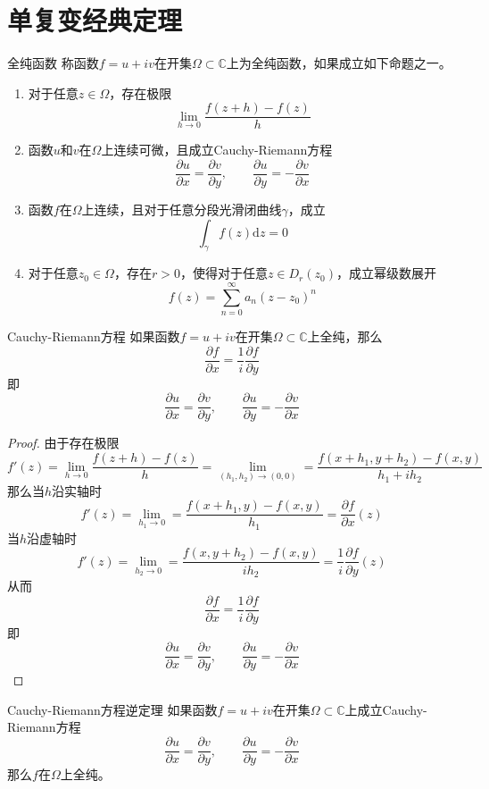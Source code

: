 \documentclass[lang = cn, scheme = chinese, thmcnt = section]{elegantbook}
\newcommand{\C}{\mathbb{C}}  		   %
\newcommand{\sub}{\subset}             %
\begin{document}
\chapter{单复变经典定理}

\begin{definition}{全纯函数}
	称函数$f=u+iv$在开集$\Omega\sub\C$上为全纯函数，如果成立如下命题之一。
	\begin{enumerate}
		\item 对于任意$z\in\Omega$，存在极限%
		$$
		\lim_{h\to 0}\frac{f(z+h)-f(z)}{h}
		$$
		\item 函数$u$和$v$在$\Omega$​上连续可微，且成立Cauchy-Riemann方程
		$$
		\frac{\partial u}{\partial x}=\frac{\partial v}{\partial y},
		\qquad
		\frac{\partial u}{\partial y}=-\frac{\partial v}{\partial x}
		$$
		\item 函数$f$在$\Omega$上连续，且对于任意分段光滑闭曲线$\gamma$，成立%
		$$
		\int_\gamma{f(z)\mathrm{d}z}=0
		$$
		\item 对于任意$z_0\in \Omega$，存在$r>0$，使得对于任意$z\in D_r(z_0)$，成立幂级数展开
		$$
		f(z)=\sum_{n=0}^{\infty}{a_n(z-z_0)^n}
		$$
	\end{enumerate}
\end{definition}

\begin{theorem}{Cauchy-Riemann方程}
	如果函数$f=u+iv$在开集$\Omega\sub\C$上全纯，那么
	$$
	\frac{\partial f}{\partial x}=\frac{1}{i}\frac{\partial f}{\partial y}
	$$
	即
	$$
	\frac{\partial u}{\partial x}=\frac{\partial v}{\partial y},
	\qquad
	\frac{\partial u}{\partial y}=-\frac{\partial v}{\partial x}
	$$
\end{theorem}

\begin{proof}
	由于存在极限%
	$$
	f'(z)=\lim_{h\to 0}\frac{f(z+h)-f(z)}{h}
	=\lim_{(h_1,h_2)\to (0,0)}=\frac{f(x+h_1,y+h_2)-f(x,y)}{h_1+ih_2}
	$$
	那么当$h$沿实轴时%
	$$
	f'(z)=\lim_{h_1\to 0}=\frac{f(x+h_1,y)-f(x,y)}{h_1}=\frac{\partial f}{\partial x}(z)
	$$
	当$h$沿虚轴时%
	$$
	f'(z)=\lim_{h_2\to 0}=\frac{f(x,y+h_2)-f(x,y)}{ih_2}=\frac{1}{i}\frac{\partial f}{\partial y}(z)
	$$
	从而
	$$
	\frac{\partial f}{\partial x}=\frac{1}{i}\frac{\partial f}{\partial y}
	$$
	即
	$$
	\frac{\partial u}{\partial x}=\frac{\partial v}{\partial y},
	\qquad
	\frac{\partial u}{\partial y}=-\frac{\partial v}{\partial x}
	$$
\end{proof}

\begin{theorem}{Cauchy-Riemann方程逆定理}
	如果函数$f=u+iv$在开集$\Omega\sub\C$上成立Cauchy-Riemann方程
	$$
	\frac{\partial u}{\partial x}=\frac{\partial v}{\partial y},
	\qquad
	\frac{\partial u}{\partial y}=-\frac{\partial v}{\partial x}
	$$
	那么$f$在$\Omega$上全纯。
\end{theorem}
\end{document}
